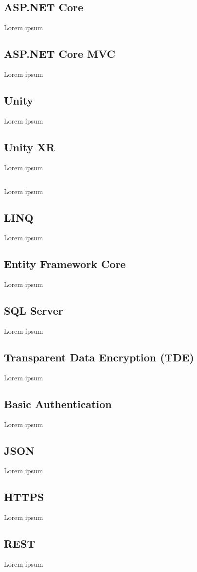 \subsection*{ASP.NET Core}

Lorem ipsum

\subsection*{ASP.NET Core MVC}
Lorem ipsum
\subsection*{Unity}
Lorem ipsum
\subsection*{Unity XR}
Lorem ipsum
\subsection*{\C}
Lorem ipsum
\subsection*{LINQ}
Lorem ipsum
\subsection*{Entity Framework Core}
Lorem ipsum
\subsection*{SQL Server}
Lorem ipsum
\subsection*{Transparent Data Encryption (TDE)}
Lorem ipsum
\subsection*{Basic Authentication}
Lorem ipsum
\subsection*{JSON}
Lorem ipsum
\subsection*{HTTPS}
Lorem ipsum
\subsection*{REST}
Lorem ipsum
